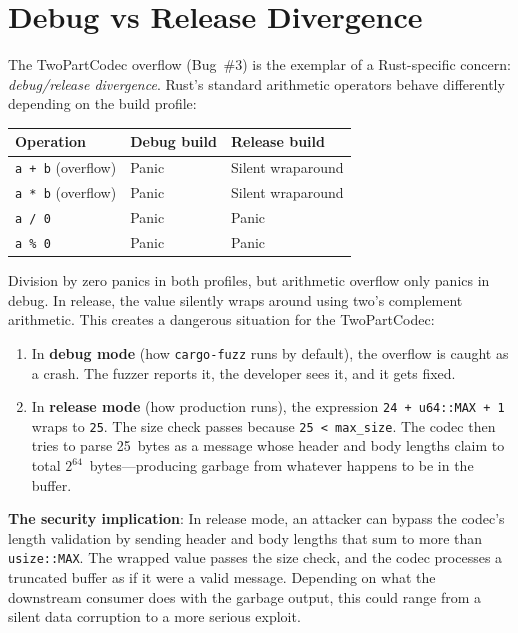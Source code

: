 \section{Debug vs Release Divergence}
\label{sec:findings:divergence}

The TwoPartCodec overflow (Bug~\#3) is the exemplar of a Rust-specific concern: \emph{debug/release divergence}. Rust's standard arithmetic operators behave differently depending on the build profile:

\begin{center}
\begin{tabular}{lll}
\toprule
\textbf{Operation} & \textbf{Debug build} & \textbf{Release build} \\
\midrule
\texttt{a + b} (overflow) & Panic & Silent wraparound \\
\texttt{a * b} (overflow) & Panic & Silent wraparound \\
\texttt{a / 0}            & Panic & Panic \\
\texttt{a \% 0}           & Panic & Panic \\
\bottomrule
\end{tabular}
\end{center}

Division by zero panics in both profiles, but arithmetic overflow only panics in debug. In release, the value silently wraps around using two's complement arithmetic. This creates a dangerous situation for the TwoPartCodec:

\begin{enumerate}
\item In \textbf{debug mode} (how \texttt{cargo-fuzz} runs by default), the overflow is caught as a crash. The fuzzer reports it, the developer sees it, and it gets fixed.
\item In \textbf{release mode} (how production runs), the expression \texttt{24\,+\,u64::MAX\,+\,1} wraps to \texttt{25}. The size check passes because \texttt{25 < max\_size}. The codec then tries to parse 25~bytes as a message whose header and body lengths claim to total $2^{64}$~bytes---producing garbage from whatever happens to be in the buffer.
\end{enumerate}

\begin{bugbox}
\textbf{The security implication}: In release mode, an attacker can bypass the codec's length validation by sending header and body lengths that sum to more than \texttt{usize::MAX}. The wrapped value passes the size check, and the codec processes a truncated buffer as if it were a valid message. Depending on what the downstream consumer does with the garbage output, this could range from a silent data corruption to a more serious exploit.
\end{bugbox}


